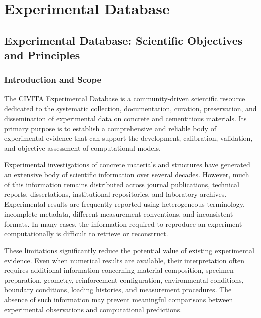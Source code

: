 
\part{Experimental Database}
\label{part:experimental-database}



\chapter[Experimental Database: Scientific Objectives and Principles]
{Experimental Database: Scientific Objectives and Principles}
\label{chap:experimental-objectives}


\section{Introduction and Scope}

The CIVITA Experimental Database is a community-driven scientific
resource dedicated to the systematic collection, documentation,
curation, preservation, and dissemination of experimental data
on concrete and cementitious materials. Its primary purpose is
to establish a comprehensive and reliable body of experimental
evidence that can support the development, calibration, validation,
and objective assessment of computational models.

Experimental investigations of concrete materials and structures
have generated an extensive body of scientific information over
several decades. However, much of this information remains
distributed across journal publications, technical reports,
dissertations, institutional repositories, and laboratory archives.
Experimental results are frequently reported using heterogeneous
terminology, incomplete metadata, different measurement conventions,
and inconsistent formats. In many cases, the information required
to reproduce an experiment computationally is difficult to retrieve
or reconstruct.

These limitations significantly reduce the potential value of
existing experimental evidence. Even when numerical results are
available, their interpretation often requires additional
information concerning material composition, specimen preparation,
geometry, reinforcement configuration, environmental conditions,
boundary conditions, loading histories, and measurement procedures.
The absence of such information may prevent meaningful comparisons
between experimental observations and computational predictions.

